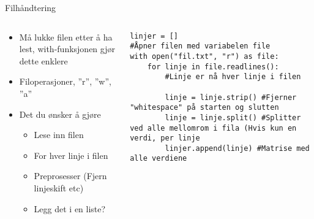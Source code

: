 \documentclass[screen, aspectratio=169]{beamer}
\begin{document}
\begin{frame}[fragile]{Filhåndtering}
	\begin{columns}
		\begin{column}{.4\textwidth}
			\begin{itemize}
				\item Må lukke filen etter å ha lest, with-funksjonen gjør dette enklere
				\item Filoperasjoner, ''r'', ''w'', ''a''
				\item Det du ønsker å gjøre
				\begin{itemize}
				    \item Lese inn filen
				    \item For hver linje i filen
				    \item Preprosesser (Fjern linjeskift etc)
				    \item Legg det i en liste? 
				\end{itemize}
			\end{itemize}
		\end{column}
		\begin{column}{.6\textwidth}
			\begin{lstlisting}
linjer = []
#Åpner filen med variabelen file
with open("fil.txt", "r") as file:
    for linje in file.readlines():
        #Linje er nå hver linje i filen
        
        linje = linje.strip() #Fjerner "whitespace" på starten og slutten
        linje = linje.split() #Splitter ved alle mellomrom i fila (Hvis kun en verdi, per linje 
        linjer.append(linje) #Matrise med alle verdiene


			\end{lstlisting}
		\end{column}
	\end{columns}
\end{frame}
\end{document}

